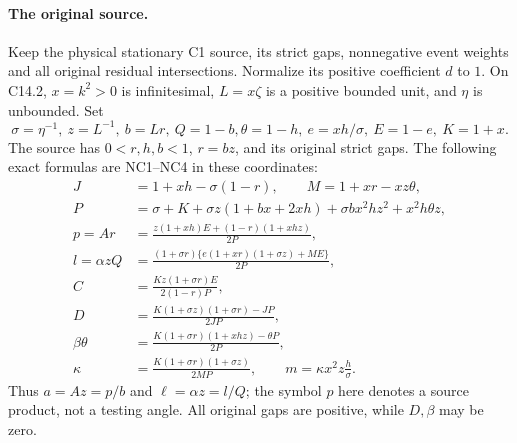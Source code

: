 \paragraph{The original source.}
Keep the physical stationary C1 source, its strict gaps,
nonnegative event weights and all original residual intersections.
Normalize its positive coefficient $d$ to $1$. On C14.2,
$x=k^2>0$ is infinitesimal, $L=x\zeta$ is a positive bounded unit,
and $\eta$ is unbounded. Set
\[
 \sigma=\eta^{-1},\ z=L^{-1},\ b=Lr,\ Q=1-b,
 \theta=1-h,\ e=xh/\sigma,\ E=1-e,\ K=1+x.
\]
The source has $0<r,h,b<1$, $r=bz$, and its original strict gaps.
The following exact formulas are NC1--NC4 in these coordinates:
\[
\begin{split}
 J&=1+xh-\sigma(1-r),\qquad M=1+xr-xz\theta,\\
 P&=\sigma+K+\sigma z(1+bx+2xh)
                  +\sigma bx^2hz^2+x^2h\theta z,\\
 p=Ar&=\frac{z(1+xh)E+(1-r)(1+xhz)}{2P},\\
 l=\alpha zQ&=\frac{(1+\sigma r)
     \{e(1+xr)(1+\sigma z)+ME\}}{2P},\\
 C&=\frac{Kz(1+\sigma r)E}{2(1-r)P},\\
 D&=\frac{K(1+\sigma z)(1+\sigma r)-JP}{2JP},\\
 \beta\theta&=\frac{K(1+\sigma r)(1+xhz)-\theta P}{2P},\\
 \kappa&=\frac{K(1+\sigma r)(1+\sigma z)}{2MP},
 \qquad m=\kappa x^2z\frac h\sigma.
\end{split}                                                     \tag{P1}
\]
Thus $a=Az=p/b$ and $\ell=\alpha z=l/Q$; the symbol $p$ here
denotes a source product, not a testing angle. All original gaps
are positive, while $D,\beta$ may be zero.

